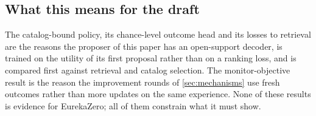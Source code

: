 \subsection{What this means for the draft}

The catalog-bound policy, its chance-level outcome head and its losses to retrieval are the reasons
the proposer of this paper has an open-support decoder, is trained on the utility of its first
proposal rather than on a ranking loss, and is compared first against retrieval and catalog
selection. The monitor-objective result is the reason the improvement rounds of \cref{sec:mechanisms}
use fresh outcomes rather than more updates on the same experience. None of these results is evidence
for EurekaZero; all of them constrain what it must show.
